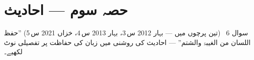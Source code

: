 %

\section*{حصہ سوم --- احادیث}

\begin{sawal}{سوال \textenglish{6} \ \textnormal{\small(تین پرچوں میں --- بہار \textenglish{2012} س\,\textenglish{3}، بہار \textenglish{2013} س\,\textenglish{4}، خزاں \textenglish{2021} س\,\textenglish{5})}}
''حفظ اللسان من الغیبۃ والشتم'' --- احادیث کی روشنی میں زبان کی حفاظت پر تفصیلی
نوٹ لکھیے۔
\end{sawal}

